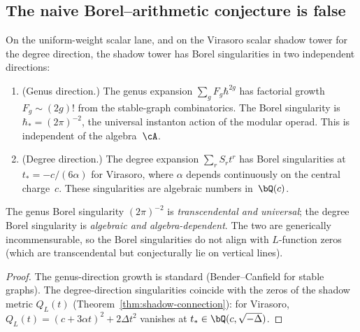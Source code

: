 \subsection{The naive Borel--arithmetic conjecture is false}%
\label{subsec:borel-arithmetic-falsified}

\begin{proposition}%
\label{prop:resurgent-orthogonality}%
%
%
On the uniform-weight scalar lane, and on the Virasoro scalar
shadow tower for the degree direction, the shadow tower has Borel
singularities in two independent directions:
\begin{enumerate}[label=\textup{(\roman*)}]
\item \textup{(Genus direction.)}
The genus expansion $\sum_g F_g \hbar^{2g}$ has
factorial growth $F_g \sim (2g)!$ from the stable-graph
combinatorics. The Borel singularity is
$\hbar_* = (2\pi)^{-2}$, the universal instanton action
of the modular operad. This is independent of the
algebra~$\cA$.
\item \textup{(Degree direction.)}
The degree expansion $\sum_r S_r t^r$ has Borel
singularities at $t_* = -c/(6\alpha)$ for Virasoro,
where $\alpha$ depends continuously on the central
charge~$c$. These singularities are algebraic
numbers in~$\bQ(c)$.
\end{enumerate}
The genus Borel singularity $(2\pi)^{-2}$ is
\emph{transcendental and universal};
the degree Borel singularity is
\emph{algebraic and algebra-dependent}.
The two are generically incommensurable, so the
Borel singularities do not align with $L$-function
zeros \textup{(}which are transcendental but
conjecturally lie on vertical lines\textup{)}.
\end{proposition}

\begin{proof}
The genus-direction growth is standard
(Bender--Canfield for stable graphs).
The degree-direction singularities coincide with the zeros
of the shadow metric $Q_L(t)$
(Theorem~\ref{thm:shadow-connection}): for Virasoro,
$Q_L(t) = (c + 3\alpha t)^2 + 2\Delta t^2$ vanishes
at $t_* \in \bQ(c, \sqrt{-\Delta})$.
\end{proof}

